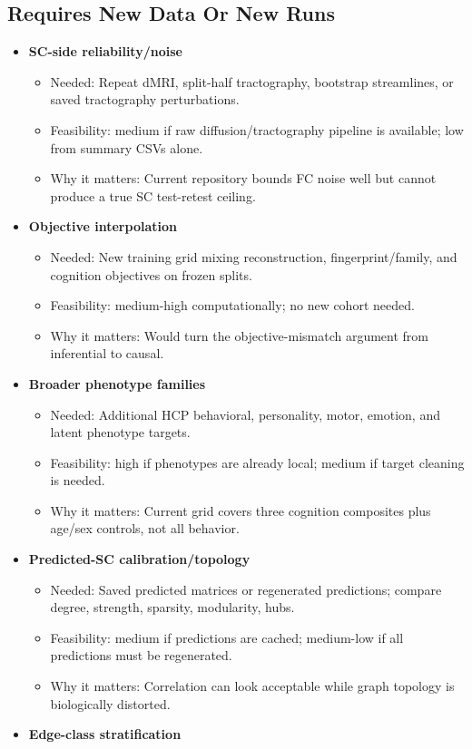 \subsection{Requires New Data Or New Runs}\label{requires-new-data-or-new-runs}

\begin{itemize}
\item
  \textbf{SC-side reliability/noise}

  \begin{itemize}
  \tightlist
  \item
    Needed: Repeat dMRI, split-half tractography, bootstrap streamlines, or saved tractography perturbations.
  \item
    Feasibility: medium if raw diffusion/tractography pipeline is available; low from summary CSVs alone.
  \item
    Why it matters: Current repository bounds FC noise well but cannot produce a true SC test-retest ceiling.
  \end{itemize}
\item
  \textbf{Objective interpolation}

  \begin{itemize}
  \tightlist
  \item
    Needed: New training grid mixing reconstruction, fingerprint/family, and cognition objectives on frozen splits.
  \item
    Feasibility: medium-high computationally; no new cohort needed.
  \item
    Why it matters: Would turn the objective-mismatch argument from inferential to causal.
  \end{itemize}
\item
  \textbf{Broader phenotype families}

  \begin{itemize}
  \tightlist
  \item
    Needed: Additional HCP behavioral, personality, motor, emotion, and latent phenotype targets.
  \item
    Feasibility: high if phenotypes are already local; medium if target cleaning is needed.
  \item
    Why it matters: Current grid covers three cognition composites plus age/sex controls, not all behavior.
  \end{itemize}
\item
  \textbf{Predicted-SC calibration/topology}

  \begin{itemize}
  \tightlist
  \item
    Needed: Saved predicted matrices or regenerated predictions; compare degree, strength, sparsity, modularity, hubs.
  \item
    Feasibility: medium if predictions are cached; medium-low if all predictions must be regenerated.
  \item
    Why it matters: Correlation can look acceptable while graph topology is biologically distorted.
  \end{itemize}
\item
  \textbf{Edge-class stratification}


\end{itemize}
